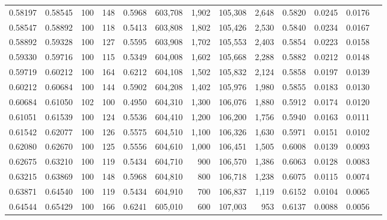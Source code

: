 \begin{tabular}{rrrrrrrrrrrrr}
0.58197 & 0.58545 &   100 & 148 &                                     0.5968 & 603,708 &   1,902 & 105,308 &   2,648 & 0.5820 & 0.0245 & 0.0176 \\
0.58547 & 0.58892 &   100 & 118 &                                     0.5413 & 603,808 &   1,802 & 105,426 &   2,530 & 0.5840 & 0.0234 & 0.0167 \\
0.58892 & 0.59328 &   100 & 127 &                                     0.5595 & 603,908 &   1,702 & 105,553 &   2,403 & 0.5854 & 0.0223 & 0.0158 \\
0.59330 & 0.59716 &   100 & 115 &                                     0.5349 & 604,008 &   1,602 & 105,668 &   2,288 & 0.5882 & 0.0212 & 0.0148 \\
0.59719 & 0.60212 &   100 & 164 &                                     0.6212 & 604,108 &   1,502 & 105,832 &   2,124 & 0.5858 & 0.0197 & 0.0139 \\
0.60212 & 0.60684 &   100 & 144 &                                     0.5902 & 604,208 &   1,402 & 105,976 &   1,980 & 0.5855 & 0.0183 & 0.0130 \\
0.60684 & 0.61050 &   102 & 100 &                                     0.4950 & 604,310 &   1,300 & 106,076 &   1,880 & 0.5912 & 0.0174 & 0.0120 \\
0.61051 & 0.61539 &   100 & 124 &                                     0.5536 & 604,410 &   1,200 & 106,200 &   1,756 & 0.5940 & 0.0163 & 0.0111 \\
0.61542 & 0.62077 &   100 & 126 &                                     0.5575 & 604,510 &   1,100 & 106,326 &   1,630 & 0.5971 & 0.0151 & 0.0102 \\
0.62080 & 0.62670 &   100 & 125 &                                     0.5556 & 604,610 &   1,000 & 106,451 &   1,505 & 0.6008 & 0.0139 & 0.0093 \\
0.62675 & 0.63210 &   100 & 119 &                                     0.5434 & 604,710 &     900 & 106,570 &   1,386 & 0.6063 & 0.0128 & 0.0083 \\
0.63215 & 0.63869 &   100 & 148 &                                     0.5968 & 604,810 &     800 & 106,718 &   1,238 & 0.6075 & 0.0115 & 0.0074 \\
0.63871 & 0.64540 &   100 & 119 &                                     0.5434 & 604,910 &     700 & 106,837 &   1,119 & 0.6152 & 0.0104 & 0.0065 \\
0.64544 & 0.65429 &   100 & 166 &                                     0.6241 & 605,010 &     600 & 107,003 &     953 & 0.6137 & 0.0088 & 0.0056 \\

\end{tabular}
